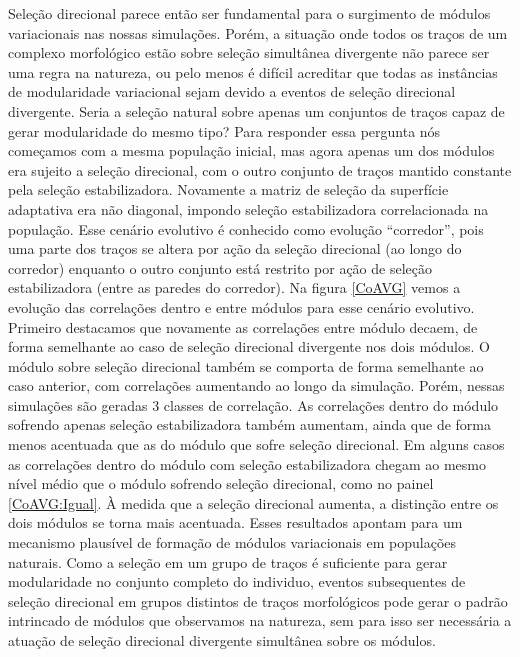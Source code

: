 Seleção direcional parece então ser fundamental para o surgimento de
módulos variacionais nas nossas simulações. 
Porém, a situação onde todos os traços de um complexo morfológico estão
sobre seleção simultânea divergente não parece ser uma regra na
natureza, ou pelo menos é difícil acreditar que todas as instâncias de
modularidade variacional sejam devido a eventos de seleção direcional
divergente. 
Seria a seleção natural sobre apenas um conjuntos de traços capaz de
gerar modularidade do mesmo tipo?
Para responder essa pergunta nós começamos com a mesma população
inicial, mas agora apenas um dos módulos era sujeito a seleção
direcional, com o outro conjunto de traços mantido constante pela
seleção estabilizadora. 
Novamente a matriz de seleção da superfície adaptativa era não diagonal,
impondo seleção estabilizadora correlacionada na população.
Esse cenário evolutivo é conhecido como evolução ``corredor'', pois uma
parte dos traços se altera por ação da seleção direcional (ao
longo do corredor) enquanto o outro conjunto está restrito por ação de
seleção estabilizadora (entre as paredes do corredor). 
Na figura \ref{CoAVG} vemos a evolução das correlações dentro e entre
módulos para esse cenário evolutivo. 
Primeiro destacamos que novamente as correlações entre módulo decaem, de
forma semelhante ao caso de seleção direcional divergente nos dois
módulos. 
O módulo sobre seleção direcional também se comporta de forma semelhante
ao caso anterior, com correlações aumentando ao longo da simulação. 
Porém, nessas simulações são geradas 3 classes de correlação. 
As correlações dentro do módulo sofrendo apenas seleção estabilizadora
também aumentam, ainda que de forma menos acentuada que as do módulo que
sofre seleção direcional. 
Em alguns casos as correlações dentro do módulo com seleção
estabilizadora chegam ao mesmo nível médio que o módulo sofrendo seleção
direcional, como no painel \ref{CoAVG:Igual}. 
À medida que a seleção direcional aumenta, a distinção entre os dois
módulos se torna mais acentuada. 
Esses resultados apontam para um mecanismo plausível de formação de
módulos variacionais em populações naturais. 
Como a seleção em um grupo de traços é suficiente para gerar
modularidade no conjunto completo do individuo, eventos subsequentes de
seleção direcional em grupos distintos de traços morfológicos pode gerar
o padrão intrincado de módulos que observamos na natureza, sem para isso
ser necessária a atuação de seleção direcional divergente simultânea sobre os
módulos. 


